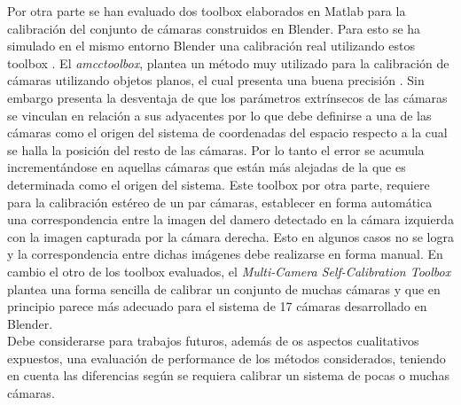 Por otra parte se han evaluado dos toolbox elaborados en Matlab para la calibración del conjunto de cámaras construidos en Blender. Para esto se ha simulado en el mismo entorno Blender una calibración real utilizando estos toolbox . El \textit{amcctoolbox}, plantea un método muy utilizado para la calibración de cámaras utilizando objetos planos, el cual presenta una buena precisión \cite{zhang_libro}. Sin embargo presenta la desventaja de que los parámetros extrínsecos de las cámaras se vinculan en relación a sus adyacentes por lo que debe definirse a una de las cámaras como el origen del sistema de coordenadas del espacio respecto a la cual se halla la posición del resto de las cámaras. Por lo tanto el error se acumula incrementándose en aquellas cámaras que están más alejadas de la que es determinada como el origen del sistema. Este toolbox por otra parte, requiere para la calibración estéreo de un par cámaras, establecer en forma automática una correspondencia entre la imagen del damero detectado en la cámara izquierda con la imagen capturada por la cámara derecha. Esto en algunos casos no se logra y la correspondencia entre dichas imágenes debe realizarse en forma manual. En cambio el otro de los toolbox evaluados, el \textit{Multi-Camera Self-Calibration Toolbox} plantea una forma sencilla de calibrar un conjunto de muchas cámaras y que en principio parece más adecuado para el sistema de 17 cámaras desarrollado en Blender.\\

Debe considerarse para trabajos futuros, además de os aspectos cualitativos expuestos,  una evaluación de performance de los métodos considerados, teniendo en cuenta las diferencias según se requiera calibrar un sistema de pocas o muchas cámaras.
